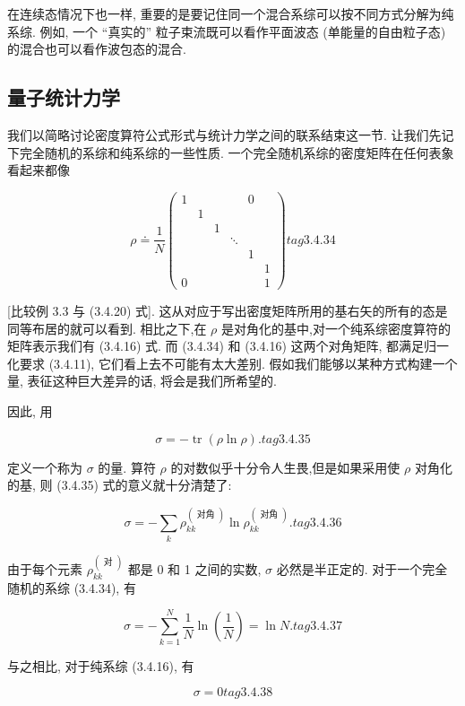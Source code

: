 在连续态情况下也一样, 重要的是要记住同一个混合系综可以按不同方式分解为纯系综. 例如, 一个 “真实的” 粒子束流既可以看作平面波态 (单能量的自由粒子态) 的混合也可以看作波包态的混合.

\subsection{量子统计力学}

我们以简略讨论密度算符公式形式与统计力学之间的联系结束这一节. 让我们先记下完全随机的系综和纯系综的一些性质. 一个完全随机系综的密度矩阵在任何表象看起来都像

$$
\rho \doteq \frac{1}{N}\left( \begin{array}{llllll} 1 & & & & 0 & \\ & 1 & & & & \\ & & 1 & & & \\ & & & \ddots & & \\ & & & & 1 & \\ & & & & & 1 \\ 0 & & & & & 1 \end{array}\right) tag{3. 4.34}
$$

[比较例 3.3 与 (3.4.20) 式]. 这从对应于写出密度矩阵所用的基右矢的所有的态是同等布居的就可以看到. 相比之下,在 $\rho$ 是对角化的基中,对一个纯系综密度算符的矩阵表示我们有 (3.4.16) 式. 而 (3.4.34) 和 (3.4.16) 这两个对角矩阵, 都满足归一化要求 (3.4.11), 它们看上去不可能有太大差别. 假如我们能够以某种方式构建一个量, 表征这种巨大差异的话, 将会是我们所希望的.

因此, 用

$$
\sigma = - \operatorname{tr}\left( {\rho \ln \rho }\right) . tag{3. 4.35}
$$

定义一个称为 $\sigma$ 的量. 算符 $\rho$ 的对数似乎十分令人生畏,但是如果采用使 $\rho$ 对角化的基, 则 (3.4.35) 式的意义就十分清楚了:

$$
\sigma = - \mathop{\sum }\limits_{k}{\rho }_{kk}^{\left( \text{ 对角 }\right) }\ln {\rho }_{kk}^{\left( \text{ 对角 }\right) }. tag{3. 4.36}
$$

由于每个元素 ${\rho }_{kk}^{\left( \text{ 对 }\right) }$ 都是 0 和 1 之间的实数, $\sigma$ 必然是半正定的. 对于一个完全随机的系综 (3.4.34), 有

$$
\sigma = - \mathop{\sum }\limits_{{k = 1}}^{N}\frac{1}{N}\ln \left( \frac{1}{N}\right) = \ln N. tag{3. 4.37}
$$

与之相比, 对于纯系综 (3.4.16), 有

$$
\sigma = 0 tag{3. 4.38}
$$

